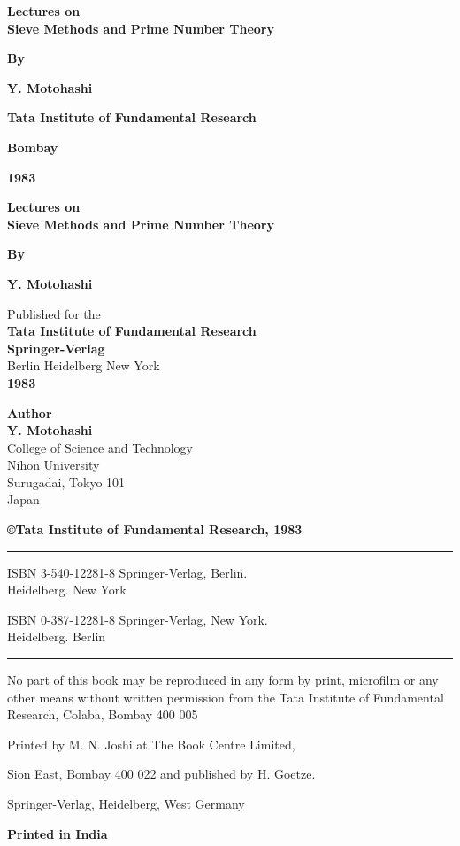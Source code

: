 \thispagestyle{empty}
\begin{center}
{\Large\bf Lectures on}\\[5pt]
{\Large\bf Sieve Methods and Prime Number Theory}
\vskip 1cm

{\bf By}
\medskip

{\large\bf Y. Motohashi}
\vfill

{\bf Tata Institute of Fundamental Research}

{\bf Bombay}

{\bf 1983}
\end{center}

\eject


\thispagestyle{empty}
\begin{center}
{\Large\bf Lectures on}\\[5pt]
{\Large\bf Sieve Methods and Prime Number Theory}
\vskip 1cm

{\bf By}
\medskip

{\large\bf Y. Motohashi}
\vfill

{Published for the}\\[5pt]
{\bf Tata Institute of Fundamental Research}\\[5pt]
{\bf Springer-Verlag}\\[5pt]
{Berlin Heidelberg New York}\\[5pt]
{\bf 1983}
\end{center}

\eject


\thispagestyle{empty}

\begin{center}
{\bf Author}\\[10pt]
{\large\bf Y. Motohashi}\\
{College of Science and Technology}\\
{Nihon University}\\
{Surugadai, Tokyo 101}\\
{Japan}
\vfill

{\large\bf\copyright  Tata Institute of Fundamental Research, 1983}
\vfill

\rule{\textwidth}{.5pt}

ISBN 3-540-12281-8 Springer-Verlag, Berlin.\\ Heidelberg. New York

ISBN 0-387-12281-8 Springer-Verlag, New York.\\ Heidelberg. Berlin

\rule{\textwidth}{.5pt}

\vfill

\parbox{0.7\textwidth}{
No part of this book may be reproduced in any 
form by print, microfilm or any other means without written permission
from the Tata Institute of Fundamental Research, Colaba, 
Bombay 400 005
}

\vfill

Printed by M. N. Joshi at The Book Centre Limited, 

Sion East, Bombay 400 022 and published by H. Goetze. 

Springer-Verlag, Heidelberg, West Germany

\vskip 1cm

{\large\bf Printed in India}
\end{center}

